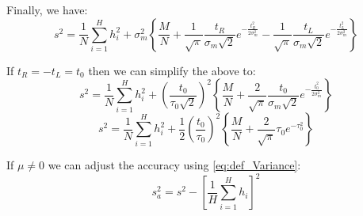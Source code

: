 \documentclass[12pt]{article}
\begin{document}
Finally, we have:
\[
s^2 =
\frac{1}{N} \sum_{i = 1}^{H} h_i^2 +
\sigma_m^2
\left\{
    \frac{M}{N} +
    \frac{1}{\sqrt{\pi}} \frac{t_R}{\sigma_m\sqrt{2}} e^{-\frac{t_R^2}{2\sigma_m^2}} -
    \frac{1}{\sqrt{\pi}} \frac{t_L}{\sigma_m\sqrt{2}} e^{-\frac{t_L^2}{2\sigma_m^2}}
\right\}
\]

If \(t_R = -t_L = t_0\) then we can simplify the above to:
\[
s^2 =
\frac{1}{N} \sum_{i = 1}^{H} h_i^2 +
\left(\frac{t_0}{\tau_0\sqrt{2}}\right)^2
\left\{
    \frac{M}{N} +
    \frac{2}{\sqrt{\pi}} \frac{t_0}{\sigma_m\sqrt{2}} e^{-\frac{t_0^2}{2\sigma_m^2}}
\right\}
\]
\[
s^2 =
\frac{1}{N} \sum_{i = 1}^{H} h_i^2 +
\frac{1}{2}
\left(\frac{t_0}{\tau_0}\right)^2
\left\{
    \frac{M}{N} +
    \frac{2}{\sqrt{\pi}} \tau_0 e^{-\tau_0^2}
\right\}
\]

If \(\mu \neq 0\) we can adjust the accuracy using \eqref{eq:def_Variance}:
\[
s_a^2 = s^2 - \left[ \frac{1}{H} \sum_{i = 1}^{H} h_i \right]^2
\]
\end{document}
